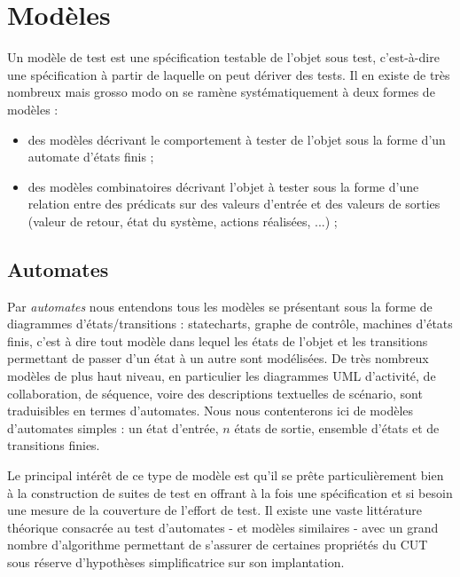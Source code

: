 \section{Mod\`eles}
  
   Un mod\`ele de test est une sp\'ecification testable de l'objet sous
   test, c'est-\`a-dire une sp\'ecification \`a partir de laquelle on peut
   d\'eriver des tests. Il en existe de tr\`es nombreux mais grosso modo
   on se ram\`ene syst\'ematiquement \`a deux formes de mod\`eles :
   
\begin{itemize}
       
\item des mod\`eles d\'ecrivant le comportement \`a tester de l'objet
    sous la forme d'un automate d'\'etats finis ; 
\item des mod\`eles combinatoires d\'ecrivant l'objet \`a tester sous la
    forme d'une relation entre des pr\'edicats sur des valeurs d'entr\'ee
    et des valeurs de sorties (valeur de retour, \'etat du syst\`eme,
    actions r\'ealis\'ees, ...) ;
\end{itemize}
  
\par
  
\subsection{Automates}
  
    Par 
\emph{automates}
   nous entendons tous les mod\`eles se
    pr\'esentant sous la forme de diagrammes d'\'etats/transitions :
    statecharts, graphe de contr\^ole, machines d'\'etats finis, c'est \`a
    dire tout mod\`ele dans lequel les \'etats de l'objet et les
    transitions permettant de passer d'un \'etat \`a un autre sont
    mod\'elis\'ees. De tr\`es nombreux mod\`eles de plus haut niveau, en
    particulier les diagrammes UML d'activit\'e, de collaboration, de
    s\'equence, voire des descriptions textuelles de sc\'enario, sont
    traduisibles en termes d'automates. Nous nous contenterons ici de
    mod\`eles d'automates simples : un \'etat d'entr\'ee, $n$
    \'etats de sortie, ensemble d'\'etats et de transitions finies.
    
\par
  Le principal int\'er\^et de ce type de mod\`ele est qu'il se pr\^ete
    particuli\`erement bien \`a la construction de suites de test en
    offrant \`a la fois une sp\'ecification et si besoin une mesure de la
    couverture de l'effort de  test. Il existe une vaste litt\'erature
    th\'eorique consacr\'ee au test d'automates - et mod\`eles similaires -
    avec un grand nombre d'algorithme permettant de s'assurer de
    certaines propri\'et\'es du CUT sous r\'eserve d'hypoth\`eses
    simplificatrice sur son implantation.
\par
  
